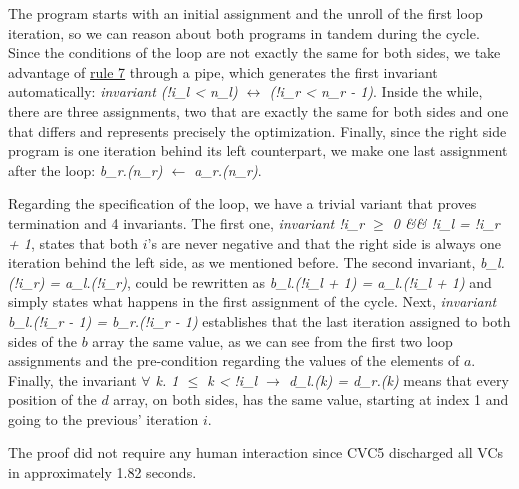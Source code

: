 The program starts with an initial assignment and the unroll of the first loop iteration, so we can reason about both programs in tandem during the cycle.
Since the conditions of the loop are not exactly the same for both sides, we take advantage of \hyperref[fig:translation-biprograms-rules]{rule 7} through a pipe, which generates the first invariant automatically: \emph{invariant (!i\_l < n\_l) $\leftrightarrow$ (!i\_r < n\_r - 1)}.
Inside the while, there are three assignments, two that are exactly the same for both sides and one that differs and represents precisely the optimization.
Finally, since the right side program is one iteration behind its left counterpart, we make one last assignment after the loop: \emph{b\_r.(n\_r) $\leftarrow$ a\_r.(n\_r)}.

Regarding the specification of the loop, we have a trivial variant that proves termination and 4 invariants.
The first one, \emph{invariant !i\_r $\geq$ 0 \&\& !i\_l = !i\_r + 1}, states that both $i$'s are never negative and that the right side is always one iteration behind the left side, as we mentioned before.
The second invariant, \emph{b\_l.(!i\_r) = a\_l.(!i\_r)}, could be rewritten as \emph{b\_l.(!i\_l + 1) = a\_l.(!i\_l + 1)} and simply states what happens in the first assignment of the cycle.
Next, \emph{invariant b\_l.(!i\_r - 1) = b\_r.(!i\_r - 1)} establishes that the last iteration assigned to both sides of the $b$ array the same value, as we can see from the first two loop assignments and the pre-condition regarding the values of the elements of $a$.
Finally, the invariant \emph{$\forall$ k. 1 $\leq$ k < !i\_l $\rightarrow$ d\_l.(k) = d\_r.(k)} means that every position of the $d$ array, on both sides, has the same value, starting at index 1 and going to the previous' iteration $i$.

The proof did not require any human interaction since CVC5 discharged all VCs in approximately 1.82 seconds.

